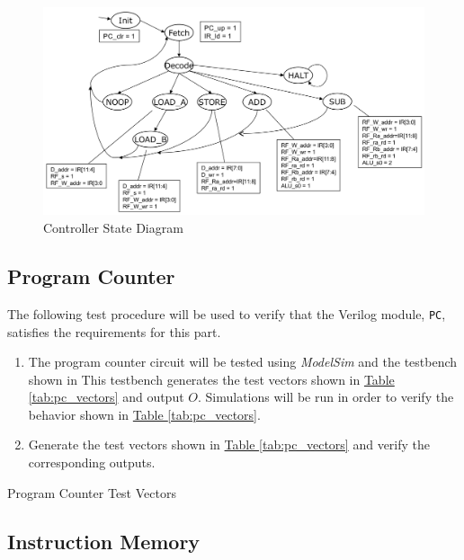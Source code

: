 \begin{figure}
    \includegraphics[width=\textwidth]{images/state_diagram.png}
    \caption{Controller State Diagram \label{fig:state_diagram}}
\end{figure}


\subsection{Program Counter} %
\label{sub:program_counter_pro}

The following test procedure will be used to verify that the Verilog module, \verb|PC|, satisfies the requirements for this part.

\begin{enumerate}
    \item The program counter circuit will be tested using \emph{ModelSim} and the testbench shown in %
    This testbench generates the test vectors shown in \hyperref[tab:pc_vectors]{Table \ref*{tab:pc_vectors}} and output $O$.
    Simulations will be run in order to verify the behavior shown in \hyperref[tab:pc_vectors]{Table \ref*{tab:pc_vectors}}.
    \item Generate the test vectors shown in \hyperref[tab:pc_vectors]{Table \ref*{tab:pc_vectors}}
    and verify the corresponding outputs.
\end{enumerate}

\begin{table}[htbp]
    \centering
    \caption{Program Counter Test Vectors\label{tab:pc_vectors}}
\end{table}


\subsection{Instruction Memory} %
\label{sub:instruction_memory}

